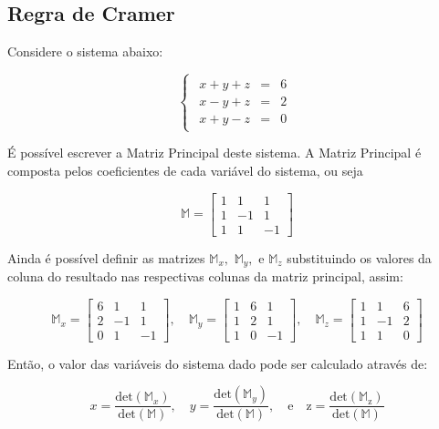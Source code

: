 \subsection{Regra de Cramer}

Considere o sistema abaixo:

$$
\begin{cases}
\begin{array}{ccc}
x+y+z & = & 6\\
x-y+z & = & 2\\
x+y-z & = & 0
\end{array}\end{cases}
$$

É possível escrever a Matriz Principal deste sistema. A Matriz Principal é composta pelos coeficientes de cada variável do sistema, ou seja

$$
\mathbb{{M}}=\begin{bmatrix}1 & 1 & 1\\
1 & -1 & 1\\
1 & 1 & -1
\end{bmatrix}
$$

Ainda é possível definir as matrizes $\mathbb{M}_x,\,\, \mathbb{M}_y,\,\, \mathrm{e}\,\, \mathbb{M}_z$ substituindo os valores da coluna do resultado nas respectivas colunas da matriz principal, assim:

$$
\mathbb{{M}}_{x}=\begin{bmatrix}6 & 1 & 1\\
2 & -1 & 1\\
0 & 1 & -1
\end{bmatrix},\quad\mathbb{{M}}_{y}=\begin{bmatrix}1 & 6 & 1\\
1 & 2 & 1\\
1 & 0 & -1
\end{bmatrix},\quad\mathbb{{M}}_{z}=\begin{bmatrix}1 & 1 & 6\\
1 & -1 & 2\\
1 & 1 & 0
\end{bmatrix}
$$

Então, o valor das variáveis do sistema dado pode ser calculado através de:

$$
x=\frac{{\mathrm{det}(\mathbb{{M}}_{x})}}{\mathrm{det}(\mathbb{M})},\quad y=\frac{\mathrm{det}(\mathbb{M}_{y})}{\mathrm{det}(\mathbb{M})},\quad\mathrm{e\quad z=\frac{\mathrm{det}(\mathbb{M}_{z})}{\mathrm{det}(\mathbb{M})}}
$$


